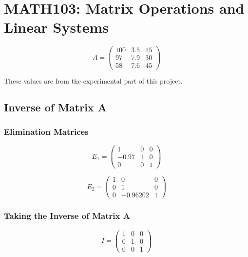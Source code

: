 \chapter{MATH103: Matrix Operations and Linear Systems}

\begin{equation}
	A = \begin{pmatrix}
		100 & 3.5 & 15 \\
		97  & 7.9 & 30 \\
		58  & 7.6 & 45
	\end{pmatrix}
\end{equation}

These values are from the experimental part of this project.

\section{Inverse of Matrix A}

\subsection{Elimination Matrices}

\begin{equation}
	E_1 = \begin{pmatrix}
		1     & 0 & 0 \\
		-0.97 & 1 & 0 \\
		0     & 0 & 1
	\end{pmatrix}
\end{equation}

\begin{equation}
	E_2 = \begin{pmatrix}
		1 & 0        & 0 \\
		0 & 1        & 0 \\
		0 & -0.96202 & 1
	\end{pmatrix}
\end{equation}

\subsection{Taking the Inverse of Matrix A}

\begin{equation}
	I = \begin{pmatrix}
		1 & 0 & 0 \\
		0 & 1 & 0 \\
		0 & 0 & 1
	\end{pmatrix}
\end{equation}

